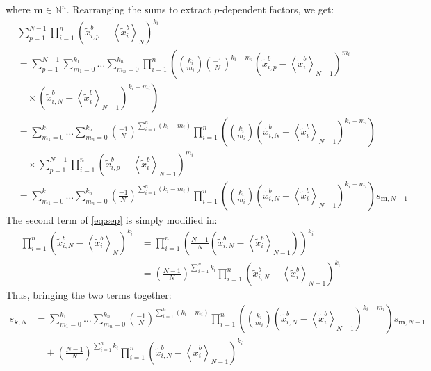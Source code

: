 \documentclass[12pt]{scrartcl}
\begin{document}
where $\mathbf{m} \in \mathbb{N}^n$. Rearranging the sums to extract $p$-dependent factors, we get:
\begin{align}
&   \sum_{p=1}^{N-1} \prod_{i=1}^n \left(\widetilde{x}^b_{i,p} - \left\langle \widetilde{x}^b_i \right\rangle_N\right)^{k_i} \nonumber \\
& = \sum_{p=1}^{N-1} \sum_{m_1=0}^{k_1} \dots \sum_{m_n=0}^{k_n} \prod_{i=1}^n \left(\binom{k_i}{m_i} \left(\frac{-1}{N}\right)^{k_i-m_i} \left(\widetilde{x}^b_{i,p} - \left\langle \widetilde{x}^b_i \right\rangle_{N-1}\right)^{m_i} \right. \nonumber \\
& \quad \times  \left. \left(\widetilde{x}^b_{i,N} - \left\langle \widetilde{x}^b_i \right\rangle_{N-1}\right)^{k_i-m_i} \right) \nonumber \\
& = \sum_{m_1=0}^{k_1} \dots \sum_{m_n=0}^{k_n} \left(\frac{-1}{N}\right)^{\sum_{i=1}^n (k_i-m_i)} \prod_{i=1}^n \left(\binom{k_i}{m_i} \left(\widetilde{x}^b_{i,N} - \left\langle \widetilde{x}^b_i \right\rangle_{N-1}\right)^{k_i-m_i} \right) \nonumber \\
& \quad \times \sum_{p=1}^{N-1} \prod_{i=1}^n \left(\widetilde{x}^b_{i,p} - \left\langle \widetilde{x}^b_i \right\rangle_{N-1}\right)^{m_i} \nonumber \\
& = \sum_{m_1=0}^{k_1} \dots \sum_{m_n=0}^{k_n} \left(\frac{-1}{N}\right)^{\sum_{i=1}^n (k_i-m_i)} \prod_{i=1}^n \left(\binom{k_i}{m_i} \left(\widetilde{x}^b_{i,N} - \left\langle \widetilde{x}^b_i \right\rangle_{N-1}\right)^{k_i-m_i} \right) s_{\mathbf{m},N-1}
\end{align}
The second term of \eqref{eq:sep} is simply modified in:
\begin{align}
\prod_{i=1}^n \left(\widetilde{x}^b_{i,N} - \left\langle \widetilde{x}^b_i \right\rangle_N\right)^{k_i} & = \prod_{i=1}^n \left(\frac{N-1}{N} \left(\widetilde{x}^b_{i,N} - \left\langle \widetilde{x}^b_i \right\rangle_{N-1}\right)\right)^{k_i} \nonumber \\
& = \left(\frac{N-1}{N}\right)^{\sum_{i=1}^n k_i} \prod_{i=1}^n \left(\widetilde{x}^b_{i,N} - \left\langle \widetilde{x}^b_i \right\rangle_{N-1}\right)^{k_i}
\end{align}
Thus, bringing the two terms together:
\begin{align}
\label{eq:som_rec}
s_{\mathbf{k},N} & = \sum_{m_1=0}^{k_1} \dots \sum_{m_n=0}^{k_n} \left(\frac{-1}{N}\right)^{\sum_{i=1}^n (k_i-m_i)} \prod_{i=1}^n \left(\binom{k_i}{m_i} \left(\widetilde{x}^b_{i,N} - \left\langle \widetilde{x}^b_i \right\rangle_{N-1}\right)^{k_i-m_i} \right) s_{\mathbf{m},N-1} \nonumber \\
& \quad + \left(\frac{N-1}{N}\right)^{\sum_{i=1}^n k_i} \prod_{i=1}^n \left(\widetilde{x}^b_{i,N} - \left\langle \widetilde{x}^b_i \right\rangle_{N-1}\right)^{k_i}
\end{align}
\end{document}
